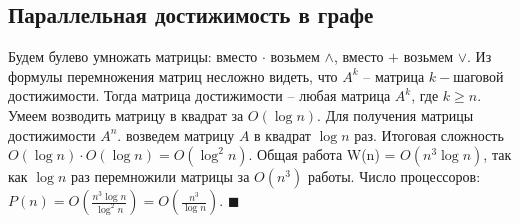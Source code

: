 \subsection{Параллельная достижимость в графе}

 Будем булево умножать матрицы: вместо $\cdot$ возьмем $\land$, вместо $+$ возьмем $\lor$. Из формулы перемножения матриц несложно видеть, что $A^k$ -- матрица $k-$шаговой достижимости. Тогда матрица достижимости -- любая матрица $A^k$, где $k\geq n$. Умеем возводить матрицу в квадрат за $O(\log n)$. Для получения матрицы достижимости $A^n$. возведем матрицу $A$ в квадрат $\log n$ раз. Итоговая сложность $O(\log n) \cdot O(\log n) = O(\log^2 n)$. Общая работа W(n) = $O(n^3\log n)$, так как $\log n$ раз перемножили матрицы за $O(n^3)$ работы. Число процессоров: $P(n) = O(\frac{n^3\log n}{\log^2 n}) = O(\frac{n^3}{\log n})$. $\blacksquare$
